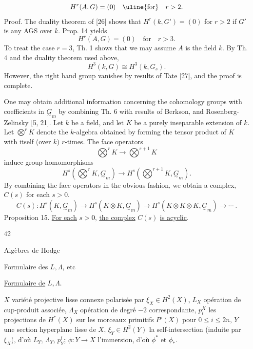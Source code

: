 \[
H^r(A,G)=(0)\quad\uline{\text{for}}\quad r>2.
\]
Proof. The duality theorem of [26] shows that $H^r(k,G')=(0)$ for $r>2$ if $G'$ is any AGS over $k$. Prop. 14 yields
\[
H^r(A,G)=(0)\quad\text{for}\quad r>3.
\]
To treat the case $r=3$, Th. 1 shows that we may assume $A$ is the field $k$. By Th. 4 and the duality theorem used above,
\[
H^3(k,G)\cong H^3(k,G_s).
\]
However, the right hand group vanishes by results of Tate [27], and the proof is complete.

One may obtain additional information concerning the cohomology groups with coefficients in $\underset{\sim}{G}_m$ by combining Th. 6 with results of Berkson, and Rosenberg-Zelinsky [5, 21]. Let $k$ be a field, and let $K$ be a purely inseparable extension of $k$. Let $\bigotimes^rK$ denote the $k$-algebra obtained by forming the tensor product of $K$ with itself (over $k$) $r$-times. The face operators
\[
\bigotimes^rK\to\bigotimes^{r+1}K
\]
induce group homomorphisms
\[
H^s(\bigotimes^rK,\underset{\sim}{G}_m)\to H^s(\bigotimes^{r+1}K,\underset{\sim}{G}_m).
\]
By combining the face operators in the obvious fashion, we obtain a complex, $C(s)$ for each $s>0$.
\[
C(s):H^s(K,\underset{\sim}{G}_m)\to H^s(K\otimes K,\underset{\sim}{G}_m)\to H^s(K\otimes K\otimes K,\underset{\sim}{G}_m)\to\cdots\ .
\]
Proposition 15. \uline{For each} $s>0$, \uline{the complex} $C(s)$ \uline{is acyclic}.

\begin{center}42\end{center}

\begin{flushright}Algèbres de Hodge\end{flushright}

\begin{flushright}Formulaire des $L,\Lambda$, etc\end{flushright}

\uline{Formulaire de} $L,\Lambda$.

$X$ variété projective lisse connexe polarisée par $\xi_X\in H^2(X)$, $L_X$ opération de cup-produit associée, $\Lambda_X$ opération de degré $-2$ correspondante, $p_i^X$ les projections de $H^*(X)$ sur les morceaux primitifs $P^i(X)$ pour $0\leq i\leq2n$, $Y$ une section hyperplane lisse de $X$, $\xi_Y\in H^2(Y)$ la self-intersection (induite par $\xi_X$), d'où $L_Y$, $\Lambda_Y$, $p_Y^i$; $\phi:Y\to X$ l'immersion, d'où $\phi^*$ et $\phi_*$.

